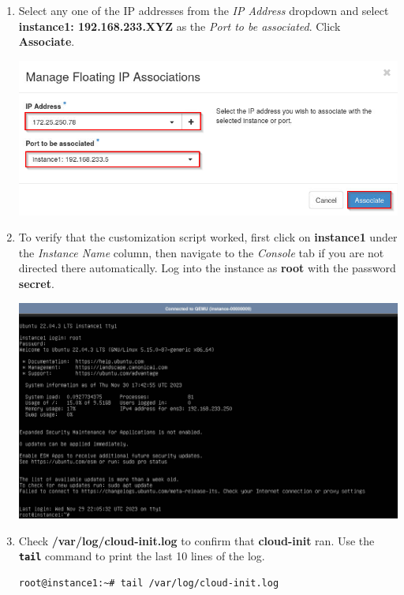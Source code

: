 \documentclass[letterpaper, 12pt]{article}
\begin{document}
\begin{enumerate}
    \item Select any one of the IP addresses from the \textit{IP Address} dropdown and select
    \textbf{instance1: 192.168.233.XYZ} as the \textit{Port to be associated}. Click \textbf{Associate}.

    \begin{center}
        \includegraphics[width=\linewidth]{images/part1/step28.png}
    \end{center}

    \item To verify that the customization script worked, first click on \textbf{instance1} under the
    \textit{Instance Name} column, then navigate to the \textit{Console} tab if you are not directed there
    automatically. Log into the instance as \textbf{root} with the password \textbf{secret}.

    \begin{center}
        \includegraphics[width=\linewidth]{images/part1/step29.png}
    \end{center}

    \item Check \textbf{/var/log/cloud-init.log} to confirm that \textbf{cloud-init} ran. Use the \textbf{\texttt{tail}}
    command to print the last 10 lines of the log.
\begin{lstlisting}
root@instance1:~# tail /var/log/cloud-init.log
\end{lstlisting}


\end{enumerate}
\end{document}
